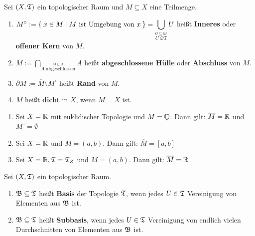 \begin{definition}
    Sei $(X, \mathfrak{T})$ ein topologischer Raum und $M \subseteq X$ eine Teilmenge.
    \begin{enumerate}[label=\alph*)]
        \item $\displaystyle M^\circ := \Set{x \in M | M \text{ ist Umgebung von } x} = \bigcup_{\overset{U \subseteq M} {U \in \mathfrak{T}}} U $ heißt \textbf{Inneres} oder \textbf{ offener Kern} von $M$.  
        \item $\displaystyle \overline{M} := \bigcap_{\overset{M \subseteq A}{A \text{ abgeschlossen}}} A$ heißt \textbf{abgeschlossene Hülle} oder \textbf{Abschluss} von $M$. 
        \item $\partial M := \overline{M} \setminus M^\circ$ heißt \textbf{Rand} von $M$. 
        \item $M$ heißt \textbf{dicht} in $X$, wenn $\overline{M} = X$ ist. 
    \end{enumerate}
\end{definition}

\begin{beispiel}
    \begin{enumerate}[label=\arabic*)]
        \item Sei $X = \mathbb{R}$ mit euklidischer Topologie und 
              $M = \mathbb{Q}$. Dann gilt: $\overline{M} = \mathbb{R}$ und 
              $M^\circ = \emptyset$
        \item Sei $X = \mathbb{R}$ und $M=(a,b)$. Dann gilt: 
              $\overline{M} = [a,b]$
        \item Sei $X = \mathbb{R}, \mathfrak{T} = \mathfrak{T}_Z$ und $M = (a,b)$. Dann gilt:
              $\overline{M} = \mathbb{R}$
    \end{enumerate}
\end{beispiel}

\begin{definition}  
    Sei $(X, \mathfrak{T})$ ein topologischer Raum.
    \begin{enumerate}[label=\alph*)]
        \item $\mathfrak{B} \subseteq \mathfrak{T}$ heißt \textbf{Basis} der Topologie $\mathfrak{T}$,
              wenn jedes $U \in \mathfrak{T}$ Vereinigung von Elementen aus $\mathfrak{B}$
              ist.
        \item $\mathfrak{B} \subseteq \mathfrak{T}$ heißt \textbf{Subbasis}, wenn jedes
              $U \in \mathfrak{T}$ Vereinigung von endlich vielen Durchschnitten
              von Elementen aus $\mathfrak{B}$ ist.
    \end{enumerate}
\end{definition}


